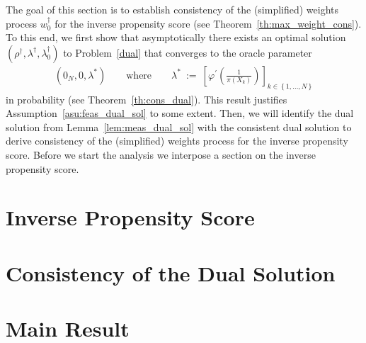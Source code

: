 The goal of this section is to establish consistency of the
(simplified) weights process $w_0^\dagger$ for the inverse propensity score (see Theorem~\ref{th:max_weight_cons}).
To this end,
we first show that asymptotically there exists an optimal solution 
$
(\rho^\dagger,\lambda^\dagger,\lambda_0^\dagger)
$
to Problem~\ref{dual} that converges to the oracle parameter
\begin{align*}
  (0_N,0,\lambda^*)
  \qquad
  \text{where}
  \qquad
  \lambda^*
  \ 
  :=
  \ 
\left[ 
\varphi^{'} \left( \frac{1}{\pi(X_k)} \right)
\right]_{k\in \left\{ 1,\ldots,N \right\}}
\end{align*}
in probability (see Theorem~\ref{th:cons_dual}).
This result justifies Assumption~\ref{asu:feas_dual_sol} to some extent.
Then, we will identify the dual solution from Lemma~\ref{lem:meas_dual_sol} 
with the consistent dual solution to derive consistency of the (simplified) weights process for the inverse propensity score.
Before we start the analysis we interpose a section on the inverse propensity score.
\section{Inverse Propensity Score}
  
\section{Consistency of the Dual Solution}
  
  \newpage 
\section{Main Result}



